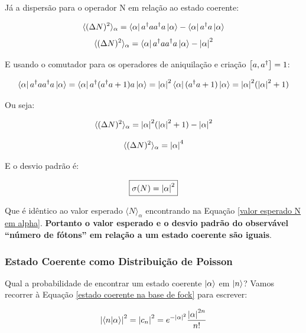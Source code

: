 \documentclass[12pt,a4paper]{report}
\begin{document}
Já a dispersão para o operador N em relação ao estado coerente:

\begin{equation*}
    \langle(\Delta N)^2\rangle_\alpha=\bra{\alpha}a^{\dag}aa^{\dag}a\ket{\alpha}-\bra{\alpha}a^{\dag}a\ket{\alpha}
\end{equation*}
\begin{equation*}
    \langle(\Delta N)^2\rangle_\alpha=\bra{\alpha}a^{\dag}aa^{\dag}a\ket{\alpha}-\abs{\alpha}^2
\end{equation*}

E usando o comutador para os operadores de aniquilação e criação $\comm{a}{a^{\dag}}=1$:

\begin{equation*}
    \bra{\alpha}a^{\dag}aa^{\dag}a\ket{\alpha}=\bra{\alpha}a^{\dag}(a^{\dag}a+1)a\ket{\alpha}=\abs{\alpha}^2\bra{\alpha}(a^{\dag}a+1)\ket{\alpha}=\abs{\alpha}^2(\abs{\alpha}^2+1)
\end{equation*}

Ou seja:

\begin{equation*}
    \langle(\Delta N)^2\rangle_\alpha=\abs{\alpha}^2(\abs{\alpha}^2+1)-\abs{\alpha}^2
\end{equation*}

\begin{equation*}
    \langle(\Delta N)^2\rangle_\alpha=\abs{\alpha}^4
\end{equation*}

E o desvio padrão é:

\begin{equation}
    \boxed{\sigma(N)=\abs{\alpha}^2}
\end{equation}

Que é idêntico ao valor esperado $\langle N \rangle_\alpha$ encontrando na Equação \ref{valor esperado N em alpha}. \textbf{Portanto o valor esperado e o desvio padrão do observável ``número de fótons'' em relação a um estado coerente são iguais}.

\subsubsection{Estado Coerente como Distribuição de Poisson}

Qual a probabilidade de encontrar um estado coerente $\ket{\alpha}$ em $\ket{n}$? Vamos recorrer à Equação \ref{estado coerente na base de fock} para escrever:

\begin{equation*}
    \abs{\braket{n}{\alpha}}^2=\abs{c_n}^2=e^{-\abs{\alpha}^2}\frac{\abs{\alpha}^{2n}}{n!} 
\end{equation*}
\end{document}
